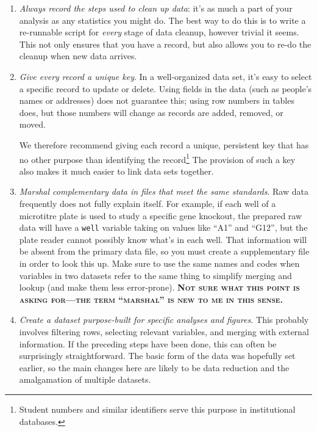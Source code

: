 \documentclass[10pt]{article}
\newcommand{\fixme}[1]{\textsc{\textbf{#1}}}
\newcommand{\recommend}[1]{\textit{#1}}
\begin{document}
\begin{enumerate}
\item
  \recommend{Always record the steps used to clean up data}:
  it's as much a part of your analysis as any statistics you might do.
  The best way to do this is to write a re-runnable script for \emph{every}
  stage of data cleanup, however trivial it seems.
  This not only ensures that you have a record,
  but also allows you to re-do the cleanup when new data arrives.

\item
  \recommend{Give every record a unique key}.  In a
  well-organized data set, it's easy to select a specific record to
  update or delete.  Using fields in the data (such as people's names or
  addresses) does not guarantee this; using row numbers in tables does,
  but those numbers will change as records are added, removed, or moved.

  We therefore recommend giving each record a unique, persistent key
  that has no other purpose than identifying the record\footnote{Student
    numbers and similar identifiers serve this purpose in institutional
    databases.} The provision of such a key also makes it much easier to
  link data sets together.

\item
  \recommend{Marshal complementary data in files that meet the
    same standards}.  Raw data frequently does not fully explain
  itself. For example, if each well of a microtitre plate is used to
  study a specific gene knockout, the prepared raw data will have a
  \texttt{well} variable taking on values like ``A1'' and ``G12'', but
  the plate reader cannot possibly know what's in each well. That
  information will be absent from the primary data file, so you must
  create a supplementary file in order to look this up. Make sure to use
  the same names and codes when variables in two datasets refer to the
  same thing to simplify merging and lookup (and make them less
  error-prone).
  \fixme{Not sure what this point is asking for---the term ``marshal''
    is new to me in this sense.}

\item
  \recommend{Create a dataset purpose-built for specific analyses
    and figures.}  This probably involves filtering rows, selecting
  relevant variables, and merging with external information. If the
  preceding steps have been done, this can often be surprisingly
  straightforward. The basic form of the data was hopefully set earlier,
  so the main changes here are likely to be data reduction and the
  amalgamation of multiple datasets.


\end{enumerate}
\end{document}
